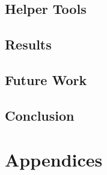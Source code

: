 \documentclass[a4paper,twoside,openright]{memoir}
\begin{document}
\chapter{Helper Tools}
\label{chapter:helper_tools}


\doubleblank

\chapter{Results}
\label{chapter:results}


\chapter{Future Work}
\label{chapter:future_work}


\chapter{Conclusion}
\label{chapter:conclusion}


\doubleblank

\part{Appendices}
\appendix





\cleardoublepage

\end{document}
